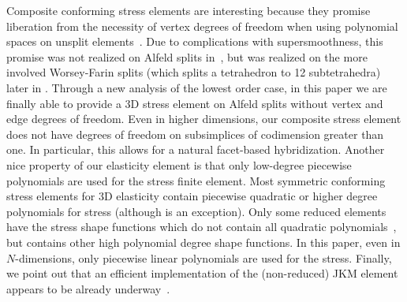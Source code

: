 \documentclass[12pt]{amsart}
\numberwithin{equation}{section}
\theoremstyle{definition}
\theoremstyle{remark}
\renewcommand{\(}{\bigl(}
\renewcommand{\)}{\bigr)}
\renewcommand\div{\operatorname{div}}
\begin{document}
Composite conforming stress elements are interesting because they promise
liberation from the necessity of vertex degrees of freedom when using
polynomial spaces on unsplit elements~\cite{arnold2008finite}. Due to complications with supersmoothness, this promise was not realized on Alfeld splits 
in~\cite{christiansen2020discrete}, but was realized on the more involved  Worsey-Farin splits (which splits a tetrahedron to 12 subtetrahedra) later in \cite{gong2023discrete}. Through a new analysis of the lowest order case, in this paper we are finally able to provide a 3D stress element on Alfeld splits without vertex and edge degrees of freedom. Even in higher dimensions, our composite stress element does not have degrees of freedom on subsimplices of codimension greater than one. In particular, this allows for a natural facet-based hybridization. %
Another nice property of our elasticity element is that only low-degree piecewise polynomials are used for the stress finite element. Most symmetric conforming stress  elements for 3D elasticity contain piecewise quadratic or higher degree polynomials for stress (although \cite{gong2023discrete} is an exception). Only some reduced elements have the stress shape functions which do not contain all quadratic polynomials~\cite{arnold2002mixed}, but contains other high polynomial degree shape functions. In this paper, even in  $N$-dimensions,  only piecewise linear polynomials are used for the stress. Finally, we point out that an efficient implementation of the (non-reduced) JKM element appears to be already underway~\cite{Brubeck-Kirby:2025,2025-defelement}.
\end{document}
